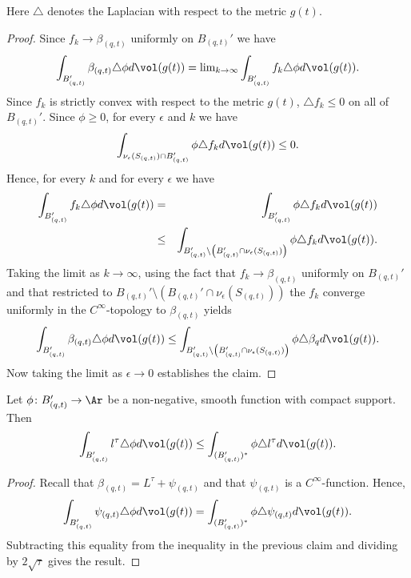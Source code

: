 \begin{remark}
\label{rem:laplacian-convention-metric-gt}
Here $\triangle$ denotes the Laplacian with respect to the metric
$g(t)$.
\end{remark}

\begin{proof}
Since $f_k\rightarrow \beta_{(q,t)}$ uniformly on $B_{(q,t)}'$ we
have
$$\int_{B_{(q,t)}'}\beta_{(q,t)}\triangle \phi d\vol(g(t))=\mathrm{lim}_{k\rightarrow
\infty}\int_{B_{(q,t)}'}f_k\triangle \phi  d\vol(g(t)).$$ Since
$f_k$ is strictly convex with respect to the metric $g(t)$,
$\triangle f_k\le 0$ on all of $B_{(q,t)}'$. Since $\phi\ge 0$, for
every $\epsilon$ and $k$ we have
$$\int_{\nu_\epsilon(S_{(q,t)})\cap B_{(q,t)}'}\phi\triangle f_k  d\vol(g(t))\le
0.$$ Hence, for every $k$ and for every $\epsilon$ we have
\begin{eqnarray*}
\int_{B_{(q,t)}'}f_k\triangle \phi d\vol(g(t)) & = &
\int_{B_{(q,t)}'}\phi\triangle f_k  d\vol(g(t)) \\
& \le & \int_{B_{(q,t)}'\setminus \left(B_{(q,t)}'\cap
\nu_\epsilon(S_{(q,t)})\right)}\phi\triangle f_k d\vol(g(t)).\end{eqnarray*}
 Taking the limit as $k\rightarrow\infty$,
using the fact that $f_k\rightarrow \beta_{(q,t)}$ uniformly on
$B_{(q,t)}'$ and that restricted to
$B_{(q,t)}'\setminus(B_{(q,t)}'\cap \nu_\epsilon (S_{(q,t)}))$ the
$f_k$ converge uniformly in the $C^\infty$-topology to
$\beta_{(q,t)}$ yields
$$\int_{B_{(q,t)}'}\beta_{(q,t)}\triangle \phi d\vol(g(t))
\le \int_{B_{(q,t)}'\setminus \left(B_{(q,t)}'\cap
\nu_\epsilon(S_{(q,t)})\right)}\phi\triangle \beta_q d\vol(g(t)).$$ Now taking the limit as $\epsilon\rightarrow 0$
establishes the claim.
\end{proof}


\begin{corollary}
\label{cor:l-tau-weak-laplacian-inequality}
\label{ltauineq}
Let $\phi\colon B_{(q,t)}'\to \Ar$ be a non-negative, smooth
function with compact support. Then
$$\int_{B_{(q,t)}'}l^\tau\triangle \phi d\vol(g(t))\le \int_{(B_{(q,t)}')^*}\phi
\triangle l^\tau d\vol(g(t)).$$
\end{corollary}


\begin{proof}
Recall that $\beta_{(q,t)}=L^\tau+\psi_{(q,t)}$ and that
$\psi_{(q,t)}$ is a $C^\infty$-function. Hence,
$$\int_{B_{(q,t)}'}\psi_{(q,t)}\triangle \phi d\vol(g(t))= \int_{(B_{(q,t)}')^*}\phi
\triangle \psi_{(q,t)} d\vol(g(t)).$$ Subtracting this equality
from the inequality in the previous claim and dividing by
$2\sqrt{\tau}$ gives the result.
\end{proof}

